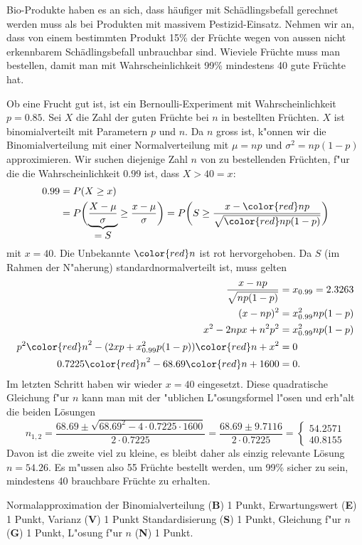 Bio-Produkte haben es an sich, dass häufiger mit Schädlingsbefall gerechnet
werden muss als bei Produkten mit massivem Pestizid-Einsatz.
Nehmen wir an, dass von einem bestimmten Produkt 15\% der Früchte wegen von
aussen nicht erkennbarem Schädlingsbefall unbrauchbar sind.
Wieviele Früchte muss man bestellen, damit man mit Wahrscheinlichkeit 99\%
mindestens 40 gute Früchte hat.


\begin{loesung}
Ob eine Frucht gut ist, ist ein Bernoulli-Experiment mit Wahrscheinlichkeit
$p=0.85$.
Sei $X$ die Zahl der guten Früchte bei $n$ in bestellten Früchten.
$X$ ist binomialverteilt mit Parametern $p$ und $n$.
Da $n$ gross ist, k"onnen wir die Binomialverteilung mit einer
Normalverteilung mit $\mu=np$ und $\sigma^2=np(1-p)$ approximieren.
Wir suchen diejenige Zahl $n$ von zu bestellenden Früchten, f"ur
die die Wahrscheinlichkeit $0.99$ ist, dass $X>40 =x$:
\begin{align*}
0.99
&=
P(X\ge x)\\
&=
P\biggl(\underbrace{\frac{X-\mu}{\sigma}}_{\displaystyle=S}\ge \frac{x-\mu}{\sigma}\biggr)
=
P\biggl(S\ge \frac{x-{\color{red}n}p}{\sqrt{{\color{red}n}p(1-p)}}\biggr)
\end{align*}
mit $x=40$.
Die Unbekannte $\color{red}n$ ist rot hervorgehoben.
Da $S$ (im Rahmen der N"aherung) standardnormalverteilt ist, muss
gelten
\begin{align*}
\frac{x-np}{\sqrt{np(1-p)}}
&=
x_{0.99}=2.3263
\\
(x-np)^2
&=
x_{0.99}^2np(1-p)
\\
x^2-2npx+n^2p^2
&=
x_{0.99}^2np(1-p)
\\
p^2{\color{red}n}^2
-
(2xp+x_{0.99}^2p(1-p)) {\color{red}n}
+
x^2
&=0
\\
0.7225 {\color{red}n}^2 -68.69 {\color{red}n} + 1600
&= 
0.
\end{align*}
Im letzten Schritt haben wir wieder $x=40$ eingesetzt.
Diese quadratische Gleichung f"ur $n$ kann man mit der "ublichen
L"osungsformel l"osen und erh"alt die beiden Lösungen
\[
n_{1,2}
=
\frac{68.69 \pm \sqrt{68.69^2-4\cdot 0.7225\cdot 1600}}{2\cdot 0.7225}
=
\frac{68.69 \pm 9.7116}{2\cdot 0.7225}
=
\begin{cases}
54.2571\\
40.8155
\end{cases}
\]
Davon ist die zweite viel zu kleine, es bleibt daher als einzig relevante
Lösung $n=54.26$.
Es m"ussen also 55 Früchte bestellt werden, um 99\% sicher zu sein,
mindestens 40 brauchbare Früchte zu erhalten.
\end{loesung}

\begin{bewertung}
Normalapproximation der Binomialverteilung ({\bf B}) 1 Punkt,
Erwartungswert ({\bf E}) 1 Punkt,
Varianz ({\bf V}) 1 Punkt
Standardisierung ({\bf S}) 1 Punkt,
Gleichung f"ur $n$ ({\bf G}) 1 Punkt,
L"osung f"ur $n$ ({\bf N}) 1 Punkt.
\end{bewertung}


